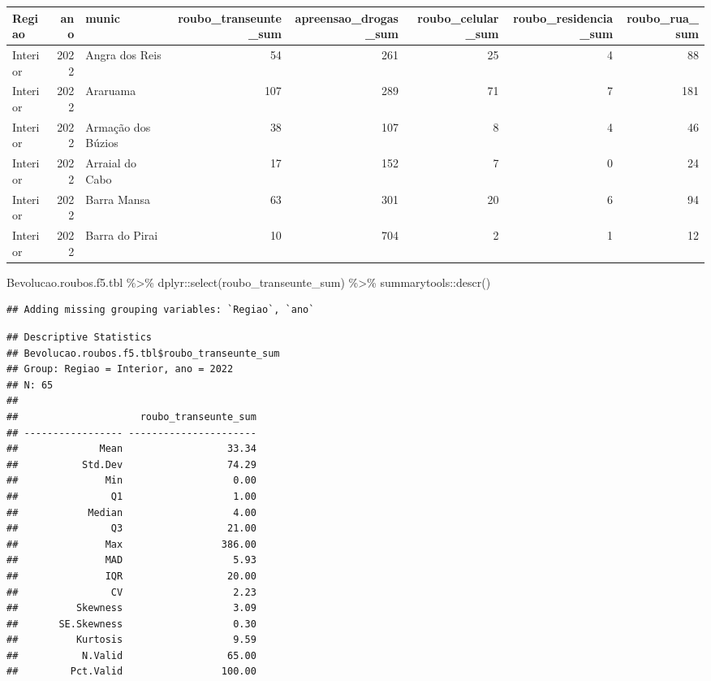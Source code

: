 \documentclass[
]{article}
\newenvironment{Shaded}{\begin{snugshade}}{\end{snugshade}}
\newcommand{\FunctionTok}[1]{\textcolor[rgb]{0.00,0.00,0.00}{#1}}
\newcommand{\NormalTok}[1]{#1}
\newcommand{\SpecialCharTok}[1]{\textcolor[rgb]{0.00,0.00,0.00}{#1}}
\begin{document}
\begin{tabular}{l|r|l|r|r|r|r|r}
\hline
Regiao & ano & munic & roubo\_transeunte\_sum & apreensao\_drogas\_sum & roubo\_celular\_sum & roubo\_residencia\_sum & roubo\_rua\_sum\\
\hline
Interior & 2022 & Angra dos Reis & 54 & 261 & 25 & 4 & 88\\
\hline
Interior & 2022 & Araruama & 107 & 289 & 71 & 7 & 181\\
\hline
Interior & 2022 & Armação dos Búzios & 38 & 107 & 8 & 4 & 46\\
\hline
Interior & 2022 & Arraial do Cabo & 17 & 152 & 7 & 0 & 24\\
\hline
Interior & 2022 & Barra Mansa & 63 & 301 & 20 & 6 & 94\\
\hline
Interior & 2022 & Barra do Pirai & 10 & 704 & 2 & 1 & 12\\
\hline
\end{tabular}

\begin{Shaded}
\begin{Highlighting}[]
\NormalTok{Bevolucao.roubos.f5.tbl }\SpecialCharTok{\%\textgreater{}\%}\NormalTok{ dplyr}\SpecialCharTok{::}\FunctionTok{select}\NormalTok{(roubo\_transeunte\_sum) }\SpecialCharTok{\%\textgreater{}\%}\NormalTok{ summarytools}\SpecialCharTok{::}\FunctionTok{descr}\NormalTok{()}
\end{Highlighting}
\end{Shaded}

\begin{verbatim}
## Adding missing grouping variables: `Regiao`, `ano`
\end{verbatim}

\begin{verbatim}
## Descriptive Statistics  
## Bevolucao.roubos.f5.tbl$roubo_transeunte_sum  
## Group: Regiao = Interior, ano = 2022  
## N: 65  
## 
##                     roubo_transeunte_sum
## ----------------- ----------------------
##              Mean                  33.34
##           Std.Dev                  74.29
##               Min                   0.00
##                Q1                   1.00
##            Median                   4.00
##                Q3                  21.00
##               Max                 386.00
##               MAD                   5.93
##               IQR                  20.00
##                CV                   2.23
##          Skewness                   3.09
##       SE.Skewness                   0.30
##          Kurtosis                   9.59
##           N.Valid                  65.00
##         Pct.Valid                 100.00
\end{verbatim}
\end{document}
